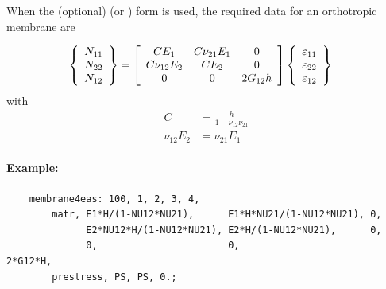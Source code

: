 When the (optional)  (or ) form is used,
the required data for an orthotropic membrane are

\begin{align}
        \cubr{\cvvect{
                N_{11}
                \\
                N_{22}
                \\
                N_{12}
        }}
        &=
        \sqbr{\matr{cccccc}{
	 CE_{1} & C\nu_{21}E_1 & 0  
	 \\
	 C\nu_{12}E_2 & CE_{2} & 0  
	 \\
	 0 & 0 & 2G_{12}h  
       }}
        \cubr{\cvvect{
                \varepsilon_{11}
                \\
                \varepsilon_{22}
                \\
                \varepsilon_{12}
        }}
\end{align}
with
\begin{subequations}
\begin{align}
	C &= \frac{h}{1-\nu_{12}\nu_{21}}
	\\
	\nu_{12}E_2 &= \nu_{21}E_1 
\end{align}
\end{subequations}

\paragraph{Example:}
\begin{verbatim}
    membrane4eas: 100, 1, 2, 3, 4,
        matr, E1*H/(1-NU12*NU21),      E1*H*NU21/(1-NU12*NU21), 0,
              E2*NU12*H/(1-NU12*NU21), E2*H/(1-NU12*NU21),      0,
              0,                       0,                       2*G12*H,
        prestress, PS, PS, 0.;
\end{verbatim}


